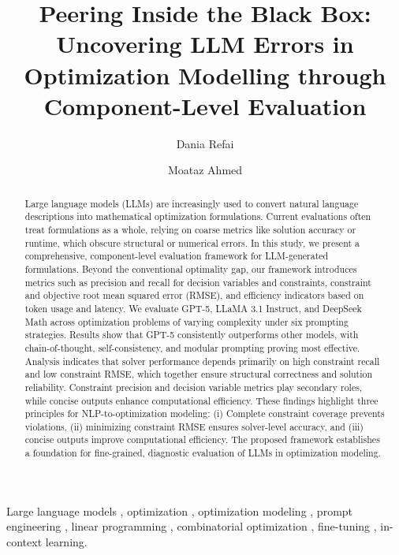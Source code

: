 \documentclass[review,12pt]{elsarticle}
\def\sep{, }%
\def\corref#1{}%
\begin{document}
\begin{frontmatter}


\title{Peering Inside the Black Box: Uncovering LLM Errors in Optimization Modelling through Component-Level Evaluation}

\author[1]{Dania Refai\corref{cor1}}
\author[1,2]{Moataz Ahmed}


\address[1]{Information and Computer Science Department, KFUPM, Dhahran 31261, Saudi Arabia}

\address[2]{SDAIA-KFUPM Joint Research Center for Artificial Intelligence, King Fahd University of Petroleum \& Minerals, Dhahran, 31261, Saudi Arabia}


\begin{abstract}
Large language models (LLMs) are increasingly used to convert natural language descriptions into mathematical optimization formulations. Current evaluations often treat formulations as a whole, relying on coarse metrics like solution accuracy or runtime, which obscure structural or numerical errors. In this study, we present a comprehensive, component-level evaluation framework for LLM-generated formulations. Beyond the conventional optimality gap, our framework introduces metrics such as precision and recall for decision variables and constraints, constraint and objective root mean squared error (RMSE), and efficiency indicators based on token usage and latency. We evaluate GPT-5, LLaMA 3.1 Instruct, and DeepSeek Math across optimization problems of varying complexity under six prompting strategies. Results show that GPT-5 consistently outperforms other models, with chain-of-thought, self-consistency, and modular prompting proving most effective. Analysis indicates that solver performance depends primarily on high constraint recall and low constraint RMSE, which together ensure structural correctness and solution reliability. Constraint precision and decision variable metrics play secondary roles, while concise outputs enhance computational efficiency. These findings highlight three principles for NLP-to-optimization modeling: (i) Complete constraint coverage prevents violations, (ii) minimizing constraint RMSE ensures solver-level accuracy, and (iii) concise outputs improve computational efficiency. The proposed framework establishes a foundation for fine-grained, diagnostic evaluation of LLMs in optimization modeling.
\end{abstract}


\begin{keyword}
Large language models \sep optimization \sep optimization modeling \sep prompt engineering \sep linear programming \sep combinatorial optimization \sep fine-tuning \sep in-context learning.
\end{keyword}

\end{frontmatter}
\end{document}
